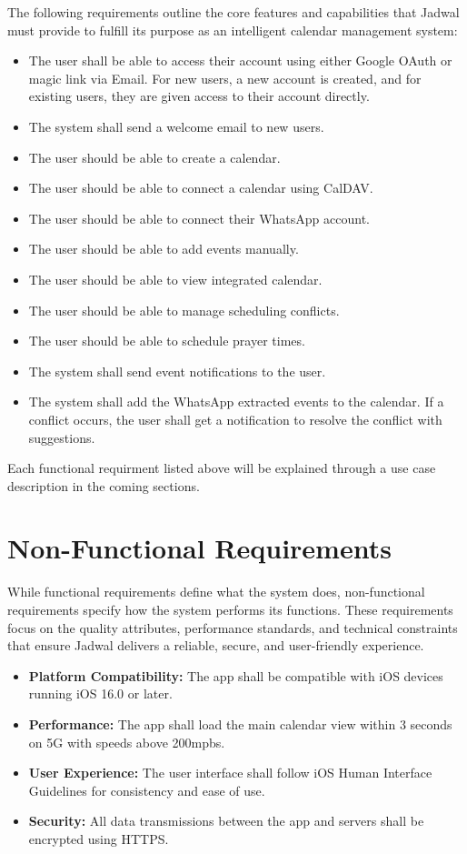 \documentclass[12pt,a4paper,twoside]{report}
\begin{document}
The following requirements outline the core features and capabilities that Jadwal must provide to fulfill its purpose as an intelligent calendar management system:
\begin{itemize}
    \item The user shall be able to access their account using either Google OAuth or magic link via Email. For new users, a new account is created, and for existing users, they are given access to their account directly.
    \item The system shall send a welcome email to new users.
    \item The user should be able to create a calendar.
    \item The user should be able to connect a calendar using CalDAV.
    \item The user should be able to connect their WhatsApp account.
    \item The user should be able to add events manually.
    \item The user should be able to view integrated calendar.
    \item The user should be able to manage scheduling conflicts.
    \item The user should be able to schedule prayer times.
    \item The system shall send event notifications to the user.
    \item The system shall add the WhatsApp extracted events to the calendar. If a conflict occurs, the user shall get a notification to resolve the conflict with suggestions.
\end{itemize}

Each functional requirment listed above will be explained through a use case description in the coming sections.

\newpage

\section{Non-Functional Requirements}

While functional requirements define what the system does, non-functional requirements specify how the system performs its functions. These requirements focus on the quality attributes, performance standards, and technical constraints that ensure Jadwal delivers a reliable, secure, and user-friendly experience.

\begin{itemize}
    \item \textbf{Platform Compatibility:} The app shall be compatible with iOS devices running iOS 16.0 or later.
    \item \textbf{Performance:} The app shall load the main calendar view within 3 seconds on 5G with speeds above 200mpbs.
    \item \textbf{User Experience:} The user interface shall follow iOS Human Interface Guidelines for consistency and ease of use.
    \item \textbf{Security:} All data transmissions between the app and servers shall be encrypted using HTTPS.
\end{itemize}
\end{document}
